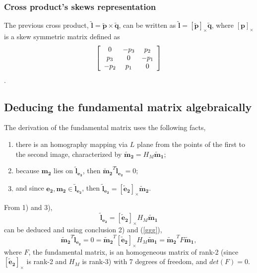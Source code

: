 \subsubsection{Cross product's \gls{skews} representation}
The previous cross product, $\mathbf{\tilde{l}} = \mathbf{\tilde{p}} \times \mathbf{\tilde{q}}$, can be written as $\mathbf{\tilde{l}} = [\mathbf{\tilde{p}}]_{\times} \mathbf{\tilde{q}}$, where $[\mathbf{p}]_{\times}$ is a skew symmetric matrix defined as
\begin{equation}
\left[ \begin{array} { c c c } { 0 } & { - p_ { 3 } } & { p_{ 2 } } \\ { p_{ 3 } } & { 0 } & { - p_{ 1 } } \\ { - p _ { 2 } } & { p_ { 1 } } & { 0 } \end{array} \right]
\end{equation}.

\subsection{Deducing the fundamental matrix algebraically}

The derivation of the fundamental matrix uses the following facts,
\begin{enumerate}
	\item there is an \gls{homography} mapping via $L$ plane from the points of the first to the second image, characterized by $\mathbf{\tilde{m}_2} = H_M \mathbf{\tilde{m}_1}$;
	\item because $\mathbf{m_2}$ lies on $\mathbf{\tilde{l}_{e_2}}$, then $\mathbf{ \tilde{m}_2 } ^T \mathbf{\tilde{l}_{e_2}} = 0$;
	\item and since $\mathbf { e_2 }, \mathbf { m_2 } \in \mathbf{\tilde{l}_{e_2}}$, then $\mathbf{\tilde{l}_{e_2}} = [\mathbf{\tilde{e}_2}]_{\times} \mathbf{\tilde{m}_2}$.
\end{enumerate}
From 1) and 3), 
\begin{equation}
\label{ggg}
\mathbf{\tilde{l}_{e_2}} = [\mathbf{\tilde{e}_2}]_{\times} H_M \mathbf{\tilde{m}_1} 
\end{equation}
can be deduced and using conclusion 2) and (\ref{ggg}),
\begin{equation}
\label{sec2:eq:fundm}
\mathbf{\tilde{m}_2}^T \mathbf{\tilde{l}_{e_2}} = 0 = \mathbf{\tilde{m}_2}^T [\mathbf{\tilde{e}_2}]_{\times} H_M \mathbf{\tilde{m}_1}  = \mathbf{\tilde{m}_2}^T F \mathbf{\tilde{m}_1},
\end{equation}
where $F$, the fundamental matrix, is an homogeneous matrix of rank-2 (since $[\mathbf{\tilde{e}_2}]_{\times}$ is rank-2 and $H_M$ is rank-3) with 7 degrees of freedom, and $det(F) = 0$.

